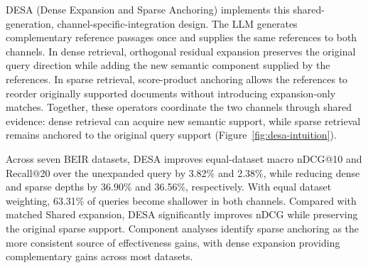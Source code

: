 DESA (Dense Expansion and Sparse Anchoring) implements this shared-generation, channel-specific-integration design. The LLM generates complementary reference passages once and supplies the same references to both channels. In dense retrieval, orthogonal residual expansion preserves the original query direction while adding the new semantic component supplied by the references. In sparse retrieval, score-product anchoring allows the references to reorder originally supported documents without introducing expansion-only matches. Together, these operators coordinate the two channels through shared evidence: dense retrieval can acquire new semantic support, while sparse retrieval remains anchored to the original query support (Figure~\ref{fig:desa-intuition}).

Across seven BEIR datasets, DESA improves equal-dataset macro nDCG@10 and Recall@20 over the unexpanded query by 3.82\% and 2.38\%, while reducing dense and sparse depths by 36.90\% and 36.56\%, respectively. With equal dataset weighting, 63.31\% of queries become shallower in both channels. Compared with matched Shared expansion, DESA significantly improves nDCG while preserving the original sparse support. Component analyses identify sparse anchoring as the more consistent source of effectiveness gains, with dense expansion providing complementary gains across most datasets.
